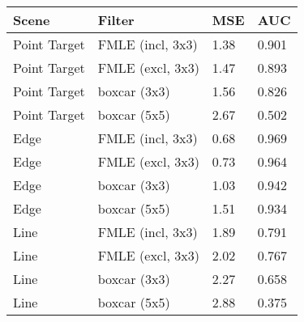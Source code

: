\begin{figure}
\begin{minipage}[c]{0.48\textwidth}
	\\
\end{minipage}
\begin{minipage}[c]{0.4\textwidth}
  \footnotesize
\begin{tabular}{|l|l|l|l|}
\hline
Scene 				& Filter 						& MSE 	& AUC \\
\hline
Point Target 	& FMLE (incl, 3x3) 	& 1.38	& 0.901 \\
Point Target 	& FMLE (excl, 3x3) 	& 1.47	& 0.893 \\
Point Target 	& boxcar (3x3) 			& 1.56	& 0.826 \\
Point Target 	& boxcar (5x5) 			& 2.67	& 0.502 \\
\hline
Edge 	& FMLE (incl, 3x3) 	& 0.68	& 0.969 \\
Edge 	& FMLE (excl, 3x3) 	& 0.73	& 0.964 \\
Edge 	& boxcar (3x3) 			& 1.03	& 0.942 \\
Edge 	& boxcar (5x5) 			& 1.51	& 0.934 \\
\hline
Line 	& FMLE (incl, 3x3) 	& 1.89	& 0.791 \\
Line 	& FMLE (excl, 3x3) 	& 2.02	& 0.767 \\
Line 	& boxcar (3x3) 			& 2.27	& 0.658 \\
Line 	& boxcar (5x5) 			& 2.88	& 0.375 \\

\end{tabular}
\end{minipage}
\end{figure}
